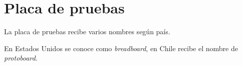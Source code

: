 \documentclass[../principal.tex]{subfiles}
\begin{document}

\section{Placa de pruebas}

La placa de pruebas recibe varios nombres según país.

En Estados Unidos se conoce como \textit{breadboard}, en Chile recibe el nombre de  \textit{protoboard}.

\newpage
\end{document}

